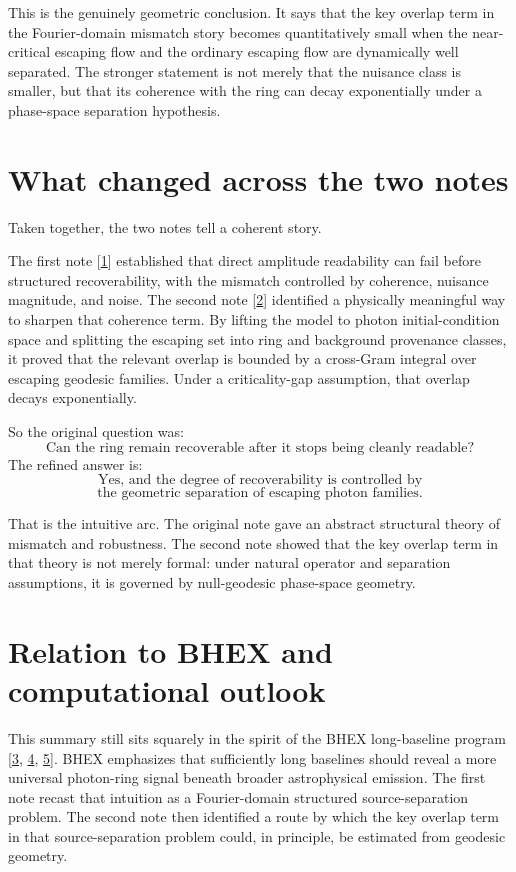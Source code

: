 \documentclass[10pt,letterpaper,twocolumn]{article}
\begin{document}
This is the genuinely geometric conclusion. It says that the key overlap term in the Fourier-domain
mismatch story becomes quantitatively small when the near-critical escaping flow and the ordinary
escaping flow are dynamically well separated. The stronger statement is not merely that the nuisance class
is smaller, but that its coherence with the ring can decay exponentially under a phase-space separation
hypothesis.

\section{What changed across the two notes}

Taken together, the two notes tell a coherent story.

The first note [\hyperlink{ref-1}{1}] established that direct amplitude readability can fail before
structured recoverability, with the mismatch controlled by coherence, nuisance magnitude, and noise.
The second note [\hyperlink{ref-2}{2}] identified a physically meaningful way to sharpen that coherence
term. By lifting the model to photon initial-condition space and splitting the escaping set into ring and
background provenance classes, it proved that the relevant overlap is bounded by a cross-Gram integral over
escaping geodesic families. Under a criticality-gap assumption, that overlap decays exponentially.

So the original question was:
\[
\text{Can the ring remain recoverable after it stops being cleanly readable?}
\]
The refined answer is:
\[
\text{Yes, and the degree of recoverability is controlled by}
\]
\[
\text{the geometric separation of escaping photon families.}
\]

That is the intuitive arc. The original note gave an abstract structural theory of mismatch and
robustness. The second note showed that the key overlap term in that theory is not merely formal: under
natural operator and separation assumptions, it is governed by null-geodesic phase-space geometry.

\section{Relation to BHEX and computational outlook}

This summary still sits squarely in the spirit of the BHEX long-baseline program
[\hyperlink{ref-3}{3}, \hyperlink{ref-4}{4}, \hyperlink{ref-5}{5}]. BHEX emphasizes that sufficiently
long baselines should reveal a more universal photon-ring signal beneath broader astrophysical emission.
The first note recast that intuition as a Fourier-domain structured source-separation problem. The second
note then identified a route by which the key overlap term in that source-separation problem could, in
principle, be estimated from geodesic geometry.
\end{document}
